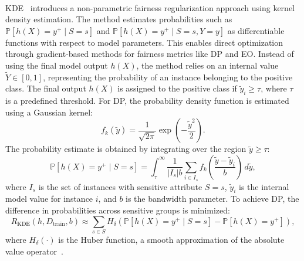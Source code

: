 \paragraph{}
\label{par:kde-fairness}
%
\Gls{KDE}~\cite{DBLP:conf/nips/ChoHS20} introduces a non-parametric fairness regularization approach using kernel density estimation.
%
The method estimates probabilities such as \( \mathbb{P}[h(X) = y^+ \mid S = s] \) and \( \mathbb{P}[h(X) = y^+ \mid S = s, Y = y] \) as differentiable functions with respect to model parameters.
%
This enables direct optimization through gradient-based methods for fairness metrics like \gls{DP} and \gls{EO}.
%
Instead of using the final model output \( h(X) \), the method relies on an internal value \( \tilde{Y} \in [0, 1] \), representing the probability of an instance belonging to the positive class.
%
The final output \( h(X) \) is assigned to the positive class if \( \tilde{y}_i \geq \tau \), where \( \tau \) is a predefined threshold.
%
For \gls{DP}, the probability density function is estimated using a Gaussian kernel:
%
\begin{equation}
    \label{eq:kde-fairness}
    f_k(\tilde{y}) = \frac{1}{\sqrt{2\pi}} \exp\left(-\frac{\tilde{y}^2}{2}\right).
\end{equation}
%
The probability estimate is obtained by integrating over the region \( \tilde{y} \geq \tau \):
%
\begin{equation}
    \label{eq:kde-fairness-probability}
    \mathbb{P}[h(X) = y^+ \mid S = s] = \int_{\tau}^{\infty} \frac{1}{|I_s|b} \sum_{i \in I_s} f_k\left(\frac{\tilde{y} - \tilde{y}_i}{b}\right) \, d\tilde{y},
\end{equation}
%
where \( I_s \) is the set of instances with sensitive attribute \( S = s \), \( \tilde{y}_i \) is the internal model value for instance \( i \), and \( b \) is the bandwidth parameter.
%
To achieve \gls{DP}, the difference in probabilities across sensitive groups is minimized:
%
\begin{equation}
    \label{eq:kde-fairness-regularizer}
    R_{\text{KDE}}(h, D_{\text{train}}, b) \approx \sum_{s \in S} H_\delta\left(\mathbb{P}[h(X) = y^+ \mid S = s] - \mathbb{P}[h(X) = y^+]\right),
\end{equation}
%
where \( H_\delta(\cdot) \) is the Huber function, a smooth approximation of the absolute value operator~\cite{10.1214/aoms/1177703732}.
%

